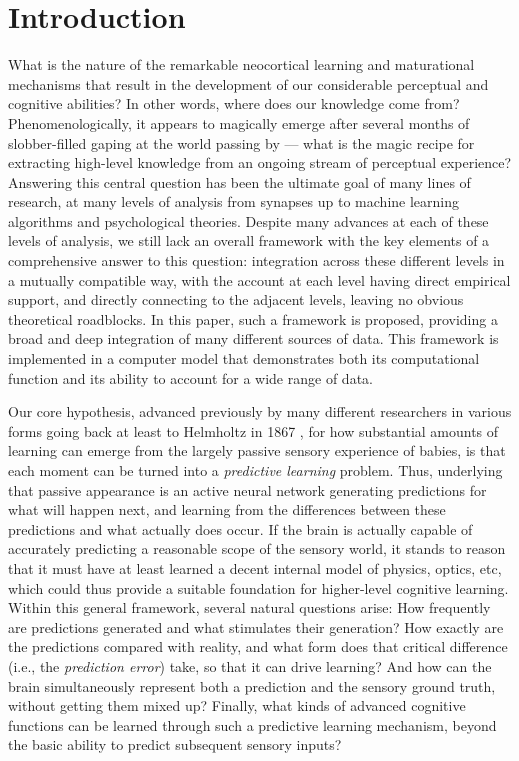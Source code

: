 \documentclass[11pt,twoside]{article}
\newif\myifpdf
\begin{document}


\section{Introduction}

What is the nature of the remarkable neocortical learning and maturational mechanisms that result in the development of our considerable perceptual and cognitive abilities?  In other words, where does our knowledge come from?  Phenomenologically, it appears to magically emerge after several months of slobber-filled gaping at the world passing by --- what is the magic recipe for extracting high-level knowledge from an ongoing stream of perceptual experience?  Answering this central question has been the ultimate goal of many lines of research, at many levels of analysis from synapses up to machine learning algorithms and psychological theories.  Despite many advances at each of these levels of analysis, we still lack an overall framework with the key elements of a comprehensive answer to this question: integration across these different levels in a mutually compatible way, with the account at each level having direct empirical support, and directly connecting to the adjacent levels, leaving no obvious theoretical roadblocks.  In this paper, such a framework is proposed, providing a broad and deep integration of many different sources of data.  This framework is implemented in a computer model that demonstrates both its computational function and its ability to account for a wide range of data.  

Our core hypothesis, advanced previously by many different researchers in various forms going back at least to Helmholtz in 1867 \cite{Helmholtz13}, for how substantial amounts of learning can emerge from the largely passive sensory experience of babies, is that each moment can be turned into a {\em predictive learning} problem.  Thus, underlying that passive appearance is an active neural network generating predictions for what will happen next, and learning from the differences between these predictions and what actually does occur.  If the brain is actually capable of accurately predicting a reasonable scope of the sensory world, it stands to reason that it must have at least learned a decent internal model of physics, optics, etc, which could thus provide a suitable foundation for higher-level cognitive learning.  Within this general framework, several natural questions arise: How frequently are predictions generated and what stimulates their generation?  How exactly are the predictions compared with reality, and what form does that critical difference (i.e., the {\em prediction error}) take, so that it can drive learning?  And how can the brain simultaneously represent both a prediction and the sensory ground truth, without getting them mixed up?  Finally, what kinds of advanced cognitive functions can be learned through such a predictive learning mechanism, beyond the basic ability to predict subsequent sensory inputs?
\end{document}
